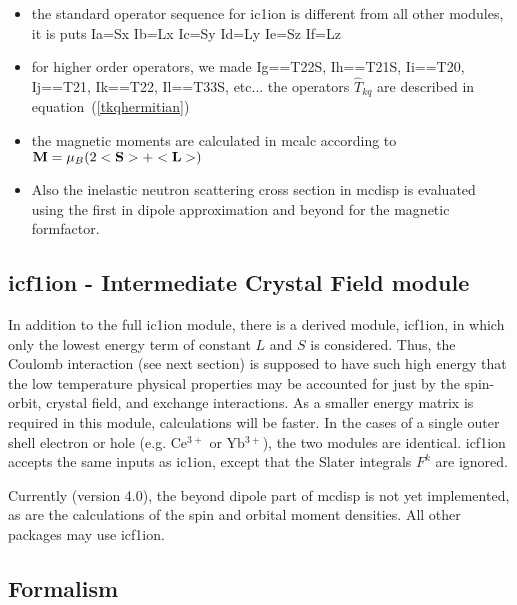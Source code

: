 \begin{itemize}
\item the standard operator sequence for ic1ion is different from all other modules, it is
puts Ia=Sx Ib=Lx Ic=Sy Id=Ly Ie=Sz If=Lz
\item for higher order operators, we made Ig==T22S, Ih==T21S, Ii==T20, Ij==T21, Ik==T22,
Il==T33S, etc... the operators $\hat T_{kq}$ are described in equation~(\ref{tkqhermitian})
\item the magnetic moments are calculated in mcalc according 
to $\mathbf M=\mu_B(2<\mathbf S>+<\mathbf L>)$
\item Also the inelastic neutron scattering cross section
 in {\prg mcdisp} is evaluated using the first
  in dipole approximation and beyond for the magnetic formfactor.
\end{itemize}

\subsection{{\prg icf1ion} - Intermediate Crystal Field module}

In addition to the full {\prg ic1ion} module, there is a derived module, {\prg icf1ion}, in which only the lowest
energy term of constant $L$ and $S$ is considered. Thus, the Coulomb interaction (see next section) is supposed
to have such high energy that the low temperature physical properties may be accounted for just by the spin-orbit,
crystal field, and exchange interactions. As a smaller energy matrix is required in this module, calculations will
be faster. In the cases of a single outer shell electron or hole (e.g. Ce$^{3+}$ or Yb$^{3+}$), the two modules are 
identical. {\prg icf1ion} accepts the same inputs as {\prg ic1ion}, except that the Slater integrals $F^k$ are 
ignored. 

Currently (version 4.0), the beyond dipole part of {\prg mcdisp} is not yet implemented, as are the calculations
of the spin and orbital moment densities. All other packages may use {\prg icf1ion}.

\subsection{Formalism}

